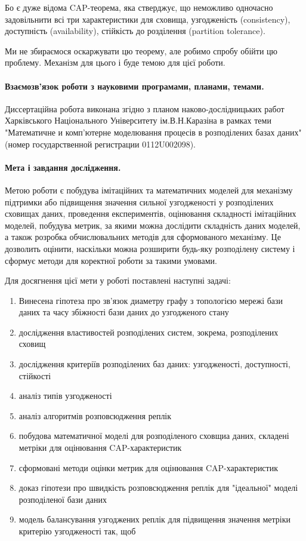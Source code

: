 \documentclass[14pt]{vakthesis}
\begin{document}
Бо є дуже відома CAP-теорема, яка стверджує, що неможливо одночасно задовільнити всі три 
характеристики для сховища, узгодженість (consistency), доступність (availability), 
стійкість до розділення (partition tolerance).

Ми не збираємося оскаржувати цю теорему, але робимо спробу обійти цю проблему. Механізм для цього і буде темою для цієї роботи.

\paragraph{\bfseries Взаємозв'язок роботи з науковими програмами, планами, темами.}
Диссертаційна робота виконана згідно з планом \linebreak
наково-дослідницьких работ Харківського Національного Університету ім.В.Н.Каразіна в рамках теми "Математичне и комп'ютерне моделювання процесів в розподілених базах даних" 
(номер государственной регистрации 0112U002098).

\paragraph{\bfseries Мета і завдання дослідження.}
Метою роботи є побудува імітаційних та математичних моделей для механізму
підтримки або підвищення значення сильної узгодженості у розподілених сховищах даних, проведення експериментів, оцінювання складності імітаційних моделей, 
побудува метрик, за якими можна дослідити складність даних моделей, а також розробка
обчислювальних методів для сформованого механізму. 
Це дозволить оцінити, наскільки можна розширити будь-яку розподілену систему і сформує методи для коректної роботи за такими умовами.

Для досягнення цієї мети у роботі поставлені наступні задачі:

\begin{enumerate}[widest=9999,itemindent=*,leftmargin=0pt]
\item Винесена гіпотеза  про зв'язок диаметру графу з топологією мережі бази даних та часу збіжності бази даних до узгодженого стану
\item дослідження властивостей розподілених систем, зокрема, розподілених сховищ
\item дослідження критеріїв розподілених баз даних: узгодженості, доступності, стійкості
\item аналіз типів узгодженості
\item аналіз алгоритмів розповсюдження реплік
\item побудова математичної моделі для розподіленого сховщиа даних, складені  метріки для оцінювання CAP-характеристик
\item сформовані методи оцінки метрик для оцінювання CAP-характеристик
\item доказ гіпотези про швидкість розповсюдження реплік для "ідеальної" моделі розподіленої бази даних  
\item модель балансування узгоджених реплік для підвищення значення метріки критерію узгодженості так, щоб  

\end{enumerate}
\end{document}
